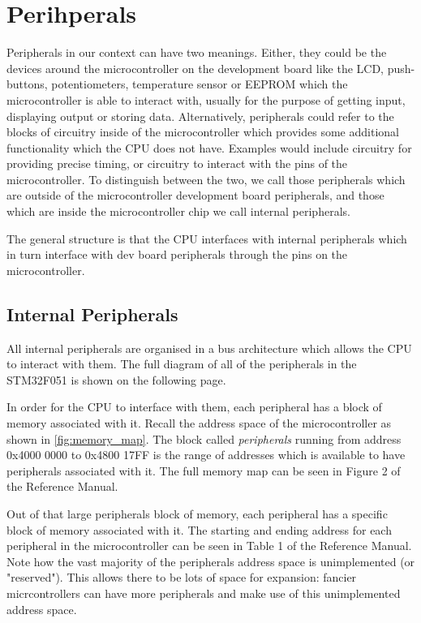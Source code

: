 \chapter{Perihperals}
Peripherals in our context can have two meanings. Either, they could be the devices around the microcontroller on the development board like the LCD, push-buttons, potentiometers, temperature sensor or EEPROM which the microcontroller is able to interact with, usually for the purpose of getting input, displaying output or storing data. Alternatively, peripherals could refer to the blocks of circuitry inside of the microcontroller which provides some additional functionality which the CPU does not have. Examples would include circuitry for providing precise timing, or circuitry to interact with the pins of the microcontroller. To distinguish between the two, we call those peripherals which are outside of the microcontroller development board peripherals, and those which are inside the microcontroller chip we call internal peripherals. 

The general structure is that the CPU interfaces with internal peripherals which in turn interface with dev board peripherals through the pins on the microcontroller.

\section{Internal Peripherals}
All internal peripherals are organised in a bus architecture which allows the CPU to interact with them. The full diagram of all of the peripherals in the STM32F051 is shown on the following page.
\afterpage{
  \centering
  
}

In order for the CPU to interface with them, each peripheral has a block of memory associated with it. Recall the address space of the microcontroller as shown in \autoref{fig:memory_map}. The block called \emph{peripherals} running from address 0x4000 0000 to 0x4800 17FF is the range of addresses which is available to have peripherals associated with it. The full memory map can be seen in Figure 2 of the Reference Manual. 

Out of that large peripherals block of memory, each peripheral has a specific block of memory associated with it. The starting and ending address for each peripheral in the microcontroller can be seen in Table 1 of the Reference Manual. Note how the vast majority of the peripherals address space is unimplemented (or "reserved"). This allows there to be lots of space for expansion: fancier micrcontrollers can have more peripherals and make use of this unimplemented address space. 

